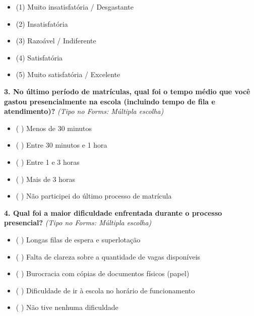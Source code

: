 \documentclass[12pt,a4paper]{article}
\begin{document}
\begin{itemize}[leftmargin=1.0cm, noitemsep]

    \item (1) Muito insatisfatória / Desgastante

    \item (2) Insatisfatória

    \item (3) Razoável / Indiferente

    \item (4) Satisfatória

    \item (5) Muito satisfatória / Excelente

\end{itemize}

\vspace{0.2cm}

\noindent \textbf{3. No último período de matrículas, qual foi o tempo médio que você gastou presencialmente na escola (incluindo tempo de fila e atendimento)?} \textit{(Tipo no Forms: Múltipla escolha)}

\begin{itemize}[leftmargin=1.0cm, noitemsep]

    \item ( ) Menos de 30 minutos

    \item ( ) Entre 30 minutos e 1 hora

    \item ( ) Entre 1 e 3 horas

    \item ( ) Mais de 3 horas

    \item ( ) Não participei do último processo de matrícula

\end{itemize}

\vspace{0.2cm}

\noindent \textbf{4. Qual foi a maior dificuldade enfrentada durante o processo presencial?} \textit{(Tipo no Forms: Múltipla escolha)}

\begin{itemize}[leftmargin=1.0cm, noitemsep]

    \item ( ) Longas filas de espera e superlotação

    \item ( ) Falta de clareza sobre a quantidade de vagas disponíveis

    \item ( ) Burocracia com cópias de documentos físicos (papel)

    \item ( ) Dificuldade de ir à escola no horário de funcionamento

    \item ( ) Não tive nenhuma dificuldade

\end{itemize}
\end{document}
